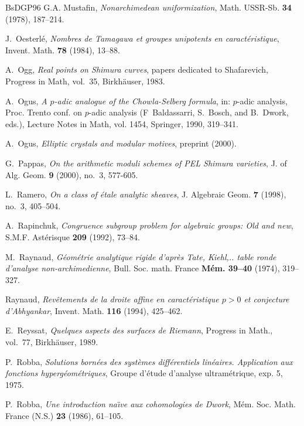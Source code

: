 \begin{thebibliography}{BsDGP96}
G.A. Mustafin, \emph{Nonarchimedean uniformization}, Math. USSR-Sb. \textbf{34}
  (1978), 187--214.

J.~Oesterl\'e, \emph{Nombres de {T}amagawa et groupes unipotents en
  caract\'eristique}, Invent. Math. \textbf{78} (1984), 13--88.

A.~Ogg, \emph{Real points on {S}himura curves}, papers dedicated to
  Shafarevich, Progress in Math, vol.~35, Birkh\"auser, 1983.

A.~Ogus, \emph{A $p$-adic analogue of the {C}howla-{S}elberg formula}, in:
  $p$-adic analysis, Proc. Trento conf. on $p$-adic analysis (F~Baldassarri,
  S.~Bosch, and B.~Dwork, eds.), Lecture Notes in Math, vol. 1454, Springer,
  1990, 319--341.

A.~Ogus, \emph{Elliptic crystals and modular motives}, preprint (2000).

G.~Pappas, \emph{On the arithmetic moduli schemes of PEL Shimura varieties}, J. of Alg. Geom.   \textbf{9} (2000), no.~3, 577-605. 

L.~Ramero, \emph{On a class of \'etale analytic sheaves}, J. Algebraic Geom.
  \textbf{7} (1998), no.~3, 405--504.

A.~Rapinchuk, \emph{Congruence subgroup problem for algebraic groups: Old and
  new}, S.M.F. Ast\'erisque \textbf{209} (1992), 73--84.

M.~Raynaud, \emph{G\'eom\'etrie analytique rigide d'apr\`es {T}ate, {K}iehl,..
  table ronde d'analyse non-archimedienne}, Bull. Soc. math. France
  \textbf{M\'em. 39--40} (1974), 319--327.

Raynaud, \emph{Rev\^etements de la droite affine en caract\'eristique $p>0$ et
  conjecture d'{A}bhyankar}, Invent. Math. \textbf{116} (1994), 425--462.

E.~Reyssat, \emph{Quelques aspects des surfaces de {R}iemann}, Progress in
  Math., vol.~77, Birkh\"auser, 1989.

P.~Robba, \emph{Solutions born\'ees des syst\`emes diff\'erentiels lin\'eaires.
  {A}pplication aux fonctions hyperg\'eom\'etriques}, Groupe d'\'etude
  d'analyse ultram\'etrique, exp. 5, 1975.

P.~Robba, \emph{Une introduction na\"{\i}ve aux cohomologies de {D}work},
  M{\'e}m. Soc. Math. France (N.S.) \textbf{23} (1986), 61--105.


\end{thebibliography}
